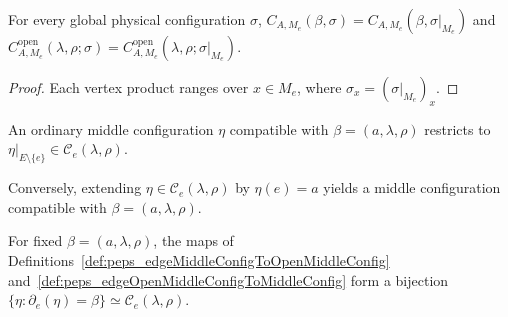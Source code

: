 \begin{lemma}%
    \label{thm:peps_edgeMiddleWeight_eq_on}
    \leanok
    For every global physical configuration $\sigma$,
    $C_{A,M_e}(\beta,\sigma)=C_{A,M_e}(\beta,\sigma|_{M_e})$ and
    $C^{\mathrm{open}}_{A,M_e}(\lambda,\rho;\sigma)=C^{\mathrm{open}}_{A,M_e}(\lambda,\rho;\sigma|_{M_e})$.
\end{lemma}
\begin{proof}\leanok
    Each vertex product ranges over $x\in M_e$, where $\sigma_x=(\sigma|_{M_e})_x$.
\end{proof}

\begin{definition}%
    \label{def:peps_edgeMiddleConfigToOpenMiddleConfig}
    \leanok
    An ordinary middle configuration $\eta$ compatible with
    $\beta=(a,\lambda,\rho)$ restricts to
    $\eta|_{E\setminus\{e\}}\in\mathcal C_e(\lambda,\rho)$.
\end{definition}

\begin{definition}%
    \label{def:peps_edgeOpenMiddleConfigToMiddleConfig}
    \leanok
    Conversely, extending $\eta\in\mathcal C_e(\lambda,\rho)$ by $\eta(e)=a$
    yields a middle configuration compatible with $\beta=(a,\lambda,\rho)$.
\end{definition}

\begin{definition}%
    \label{def:peps_edgeMiddleConfigEquivOpenMiddleConfig}
    \leanok
    For fixed $\beta=(a,\lambda,\rho)$, the maps of
    Definitions~\ref{def:peps_edgeMiddleConfigToOpenMiddleConfig}
    and~\ref{def:peps_edgeOpenMiddleConfigToMiddleConfig} form a bijection
    $\{\eta:\partial_e(\eta)=\beta\}\simeq\mathcal C_e(\lambda,\rho)$.
\end{definition}

